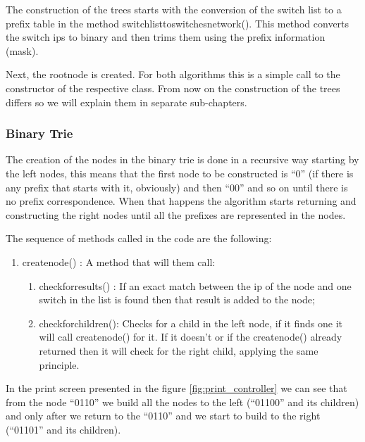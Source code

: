\documentclass[]{report}
\begin{document}
The construction of the trees starts with the conversion of the switch list to a prefix table in the method switch\textunderscore list\textunderscore to\textunderscore switches\textunderscore network(). This method converts the switch ips to binary and then trims them using the prefix information (mask).

Next, the root\textunderscore node is created. For both algorithms this is a simple call to the constructor of the respective class.
From now on the construction of the trees differs so we will explain them in separate sub-chapters.

\subsubsection{Binary Trie}
The creation of the nodes in the binary trie is done in a recursive way starting by the left nodes, this means that the first node to be constructed is “0” (if there is any prefix that starts with it, obviously) and then “00” and so on until there is no prefix correspondence. When that happens the algorithm starts returning and constructing the right nodes until all the prefixes are represented in the nodes.
	
The sequence of methods called in the code are the following: 
\begin{enumerate}
\item create\textunderscore node() : A method that will them call:
\begin{enumerate}
\item check\textunderscore for\textunderscore results() : If an exact match between the ip of the node and one switch in the list is found then that result is added to the node;
\item check\textunderscore for\textunderscore children(): Checks for a child in the left node, if it finds one it will call create\textunderscore node() for it. If it doesn’t or if the create\textunderscore node() already returned then it will check for the right child, applying the same principle. 
\end{enumerate}
\end{enumerate}

In the print screen presented in the figure \ref{fig:print_controller} we can see that from the node “0110” we build all the nodes to the left (“01100” and its children) and only after we return to the “0110” and we start to build to the right (“01101” and its children).
\end{document}
